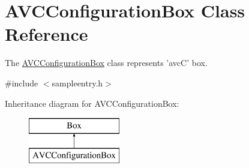 \hypertarget{class_a_v_c_configuration_box}{\section{A\-V\-C\-Configuration\-Box Class Reference}
\label{class_a_v_c_configuration_box}
}


The \hyperlink{class_a_v_c_configuration_box}{A\-V\-C\-Configuration\-Box} class represents 'avc\-C' box.  




{\ttfamily \#include $<$sampleentry.\-h$>$}

Inheritance diagram for A\-V\-C\-Configuration\-Box\-:\begin{figure}[H]
\begin{center}
\leavevmode
\includegraphics[height=2.000000cm]{class_a_v_c_configuration_box}
\end{center}
\end{figure}
